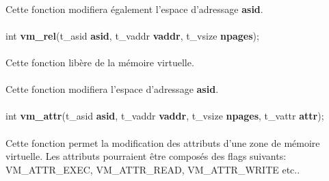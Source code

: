 \documentclass[10pt,a4wide]{article}
\begin{document}
\paragraph{}

Cette fonction modifiera \'egalement l'espace d'adressage \textbf{asid}.

\paragraph{}

\hspace{1.5cm}int \textbf{vm\_rel}(t\_asid \textbf{asid},
                                   t\_vaddr \textbf{vaddr},
                                   t\_vsize \textbf{npages});

\paragraph{}

Cette fonction lib\`ere de la m\'emoire virtuelle.

\paragraph{}

Cette fonction modifiera l'espace d'adressage \textbf{asid}.

\paragraph{}

\hspace{1.5cm}int \textbf{vm\_attr}(t\_asid \textbf{asid},
                                    t\_vaddr \textbf{vaddr},
                                    t\_vsize \textbf{npages},
                                    t\_vattr \textbf{attr});

\paragraph{}

Cette fonction permet la modification des attributs d'une zone de
m\'emoire virtuelle. Les attributs pourraient \^etre compos\'es
des flags suivants: VM\_ATTR\_EXEC, VM\_ATTR\_READ, VM\_ATTR\_WRITE etc..

\paragraph{}
\end{document}
